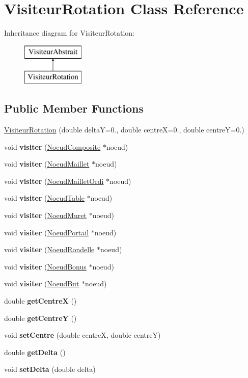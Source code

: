 \hypertarget{class_visiteur_rotation}{}\section{Visiteur\+Rotation Class Reference}
\label{class_visiteur_rotation}
Inheritance diagram for Visiteur\+Rotation\+:\begin{figure}[H]
\begin{center}
\leavevmode
\includegraphics[height=2.000000cm]{class_visiteur_rotation}
\end{center}
\end{figure}
\subsection*{Public Member Functions}
\begin{DoxyCompactItemize}
\item 
\hyperlink{group__inf2990_gade614dba20fb246941d1e91dbe831852}{Visiteur\+Rotation} (double deltaY=0., double centreX=0., double centreY=0.)
\item 
void {\bfseries visiter} (\hyperlink{class_noeud_composite}{Noeud\+Composite} $\ast$noeud)
\item 
void {\bfseries visiter} (\hyperlink{class_noeud_maillet}{Noeud\+Maillet} $\ast$noeud)
\item 
void {\bfseries visiter} (\hyperlink{class_noeud_maillet_ordi}{Noeud\+Maillet\+Ordi} $\ast$noeud)
\item 
void {\bfseries visiter} (\hyperlink{class_noeud_table}{Noeud\+Table} $\ast$noeud)
\item 
void {\bfseries visiter} (\hyperlink{class_noeud_muret}{Noeud\+Muret} $\ast$noeud)
\item 
void {\bfseries visiter} (\hyperlink{class_noeud_portail}{Noeud\+Portail} $\ast$noeud)
\item 
void {\bfseries visiter} (\hyperlink{class_noeud_rondelle}{Noeud\+Rondelle} $\ast$noeud)
\item 
void {\bfseries visiter} (\hyperlink{class_noeud_bonus}{Noeud\+Bonus} $\ast$noeud)
\item 
void {\bfseries visiter} (\hyperlink{class_noeud_but}{Noeud\+But} $\ast$noeud)
\item 
double {\bfseries get\+CentreX} ()
\item 
double {\bfseries get\+CentreY} ()
\item 
void {\bfseries set\+Centre} (double centreX, double centreY)
\item 
double {\bfseries get\+Delta} ()
\item 
void {\bfseries set\+Delta} (double delta)
\end{DoxyCompactItemize}


